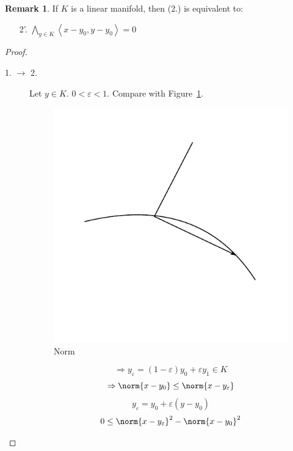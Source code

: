 \documentclass[a4paper,landscape,twocolumn]{article}
\newcommand\functional[1]{\left\langle{#1}\right\rangle}
\theoremstyle{definition}
\newtheorem{rem}{Remark}
\DeclarePairedDelimiter\norm\lVert\rVert
\begin{document}
\begin{rem}
  If $K$ is a linear manifold, then (2.) is equivalent to:
  \begin{enumerate}
    \item[2'.] $\bigwedge_{y \in K} \functional{x - y_0, y - y_0} = 0$
  \end{enumerate}
\end{rem}

\begin{proof}
  \begin{description}
    \item[1. $\rightarrow$ 2.]
      Let $y \in K$. $0 < \varepsilon < 1$. Compare with Figure~\ref{img:norm}.
      \begin{figure}[!h]
        \begin{center}
          \includegraphics{img/norm.pdf}
          \caption{Norm}
          \label{img:norm}
        \end{center}
      \end{figure}
      \[ \Rightarrow y_\varepsilon = (1 - \varepsilon) y_0 + \varepsilon y_1 \in K \]
      \[ \Rightarrow \norm{x - y_0} \leq \norm{x - y_\varepsilon} \]
      \[ y_\varepsilon = y_0 + \varepsilon (y - y_0) \]
      \begin{align*}
        0 &\leq \norm{x - y_\varepsilon}^2 - \norm{x - y_0}^2 \\

\end{align*}
\end{description}
\end{proof}
\end{document}
